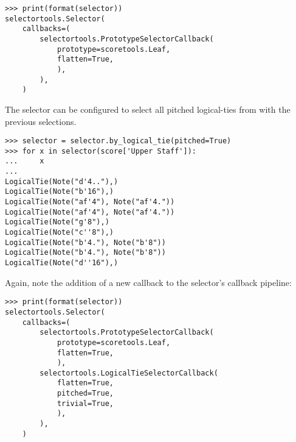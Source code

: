 \begin{comment}
<abjad>
print(format(selector))
</abjad>
\end{comment}

\begin{abjadbookoutput}
\begin{singlespacing}
\vspace{-0.5\baselineskip}
\begin{lstlisting}
>>> print(format(selector))
selectortools.Selector(
    callbacks=(
        selectortools.PrototypeSelectorCallback(
            prototype=scoretools.Leaf,
            flatten=True,
            ),
        ),
    )
\end{lstlisting}
\end{singlespacing}
\end{abjadbookoutput}

\noindent The selector can be configured to select all pitched logical-ties
from with the previous selections.

\begin{comment}
<abjad>
selector = selector.by_logical_tie(pitched=True)
for x in selector(score['Upper Staff']):
    x

</abjad>
\end{comment}

\begin{abjadbookoutput}
\begin{singlespacing}
\vspace{-0.5\baselineskip}
\begin{lstlisting}
>>> selector = selector.by_logical_tie(pitched=True)
>>> for x in selector(score['Upper Staff']):
...     x
...
LogicalTie(Note("d'4.."),)
LogicalTie(Note("b'16"),)
LogicalTie(Note("af'4"), Note("af'4."))
LogicalTie(Note("af'4"), Note("af'4."))
LogicalTie(Note("g'8"),)
LogicalTie(Note("c''8"),)
LogicalTie(Note("b'4."), Note("b'8"))
LogicalTie(Note("b'4."), Note("b'8"))
LogicalTie(Note("d''16"),)
\end{lstlisting}
\end{singlespacing}
\end{abjadbookoutput}

\noindent Again, note the addition of a new callback to the selector's callback
pipeline:

\begin{comment}
<abjad>
print(format(selector))
</abjad>
\end{comment}

\begin{abjadbookoutput}
\begin{singlespacing}
\vspace{-0.5\baselineskip}
\begin{lstlisting}
>>> print(format(selector))
selectortools.Selector(
    callbacks=(
        selectortools.PrototypeSelectorCallback(
            prototype=scoretools.Leaf,
            flatten=True,
            ),
        selectortools.LogicalTieSelectorCallback(
            flatten=True,
            pitched=True,
            trivial=True,
            ),
        ),
    )
\end{lstlisting}
\end{singlespacing}
\end{abjadbookoutput}

